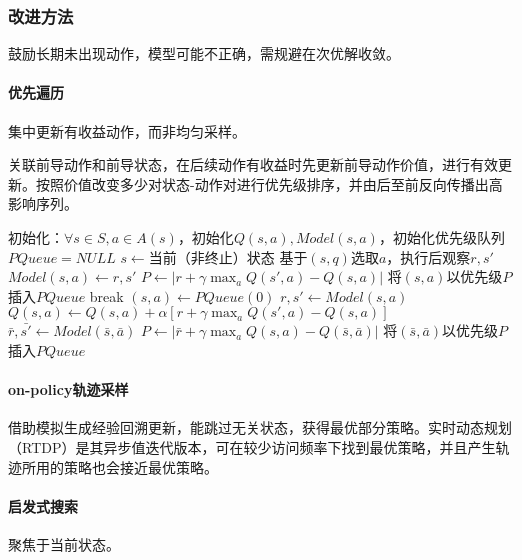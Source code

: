 \documentclass[
12pt, %
a4paper, 
oneside, %
headinclude,footinclude, %
]{scrartcl}
\begin{document}
\subsubsection[改进方法]{改进方法}
鼓励长期未出现动作，模型可能不正确，需规避在次优解收敛。
\paragraph{优先遍历}
集中更新有收益动作，而非均匀采样。

关联前导动作和前导状态，在后续动作有收益时先更新前导动作价值，进行有效更新。按照价值改变多少对状态-动作对进行优先级排序，并由后至前反向传播出高影响序列。
\begin{myalgorithm}[确定性环境下的优先遍历]
\State 初始化：$ \forall s \in S, a \in A(s) $，初始化$ Q(s, a), Model(s, a) $，初始化优先级队列$ PQueue = NULL $
\Loop
\State $ s \gets $当前（非终止）状态
\State 基于$ (s, q) $选取$ a $，执行后观察$ r,s' $ 
\State $ Model(s, a) \gets r,s'$
\State $ P \gets |r + \gamma \max_a Q(s', a) - Q(s, a)| $ 
\State 将$ (s, a) $以优先级$ P $插入$ PQueue $
\EndIf
{}
\State break
\EndIf
\State $ (s, a) \gets PQueue(0) $ 
\State $ r, s' \gets Model(s, a) $ 
\State $ Q(s, a) \gets Q(s, a) + \alpha[r + \gamma \max_a Q(s', a) - Q(s, a)] $ 
 
\State $ \bar{r}, \bar{s'} \gets Model(\bar{s}, \bar{a}) $
\State $ P \gets |\bar{r} + \gamma \max_a Q(s, a) - Q(\bar{s}, \bar{a})| $
\State 将$ (\bar{s}, \bar{a}) $以优先级$ P $插入$ PQueue $
\EndIf
\EndIf
\EndFor
\EndFor
\EndLoop
\end{myalgorithm}
\paragraph{on-policy轨迹采样}
借助模拟生成经验回溯更新，能跳过无关状态，获得最优部分策略。实时动态规划（RTDP）是其异步值迭代版本，可在较少访问频率下找到最优策略，并且产生轨迹所用的策略也会接近最优策略。
\paragraph{启发式搜索}
聚焦于当前状态。
\end{document}
